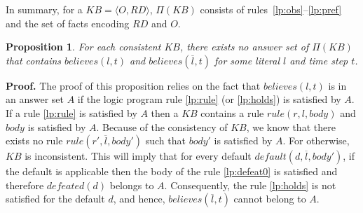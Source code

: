 \documentclass{article}
\newtheorem{proposition}[theorem]{Proposition}
\def\naf{\: {not} \:}
\begin{document}
%
% 
% 
%
%
%
%
%
%
%
%
%

In summary, for a $KB = \langle O, RD \rangle$, $\Pi(KB)$ consists of rules~\eqref{lp:obs}--\eqref{lp:pref} and the set of facts encoding $RD$ and $O$.

%
\begin{proposition}
For each consistent $KB$,  there exists no answer set of $\Pi(KB)$ that contains $believes(l, t)$ and $believes(\overline{l},t)$ for some 
literal $l$ and time step $t$. 
\end{proposition} 
%
\noindent
{\bf Proof.}
The proof of this proposition relies on the fact that $believes(l, t)$ is in an answer set $A$ if the logic program  rule \eqref{lp:rule} (or \eqref{lp:holds}) is satisfied by $A$. If a rule \eqref{lp:rule} is satisfied by $A$ then a $KB$ contains a rule $rule(r,l,body)$ and $body$ is satisfied by $A$. Because of the consistency of $KB$, we know that there exists no rule $rule(r', \overline{l}, body')$ such that $body'$ is satisfied by $A$. For otherwise, $KB$ is inconsistent. This will imply that for every default $default(d, \overline{l}, body')$, if the default is applicable then the body of the rule \eqref{lp:defeat0} is satisfied and therefore $defeated(d)$ belongs to $A$. Consequently, the rule \eqref{lp:holds} is not satisfied for the default $d$, and hence, $believes(\overline{l}, t)$ cannot belong to $A$.
\end{document}
